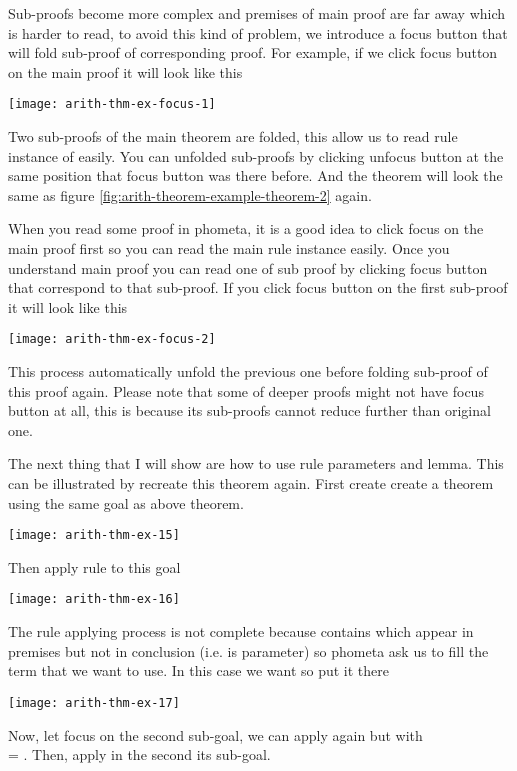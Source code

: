 \documentclass[master.tex]{subfiles}
\begin{document}
Sub-proofs become more complex and premises of main proof are far away which
is harder to read, to avoid this kind of problem, we introduce a focus button
that will fold sub-proof of corresponding proof. For example, if we click
focus button on the main proof it will look like this

\texttt{[image: arith-thm-ex-focus-1]}

Two sub-proofs of the main theorem are folded, this allow us to read rule
instance of  easily. You can unfolded sub-proofs by clicking
unfocus button at the same position that focus button was there before. And the
theorem will look the same as figure \ref{fig:arith-theorem-example-theorem-2}
again.

When you read some proof in phometa, it is a good idea to click focus on the
main proof first so you can read the main rule instance easily. Once you
understand main proof you can read one of sub proof by clicking focus button
that correspond to that sub-proof. If you click focus button on the first
sub-proof it will look like this

\texttt{[image: arith-thm-ex-focus-2]}

This process automatically unfold the previous one before folding sub-proof
of this proof again. Please note that some of deeper proofs might not have
focus button at all, this is because its sub-proofs cannot reduce further than
original one.

The next thing that I will show are how to use rule parameters and lemma. This
can be illustrated by recreate this theorem again. First create create a theorem
 using the same goal as above theorem.

\texttt{[image: arith-thm-ex-15]}

Then apply rule  to this goal

\texttt{[image: arith-thm-ex-16]}

The rule applying process is not complete because  contains
 which appear in premises but not in conclusion (i.e.  is
parameter) so phometa ask us to fill the term that we want to use. In this case
we want  so put it there

\texttt{[image: arith-thm-ex-17]}

Now, let focus on the second sub-goal, we can apply  again but
with \\  = . Then, apply  in the second its sub-goal.
\end{document}
